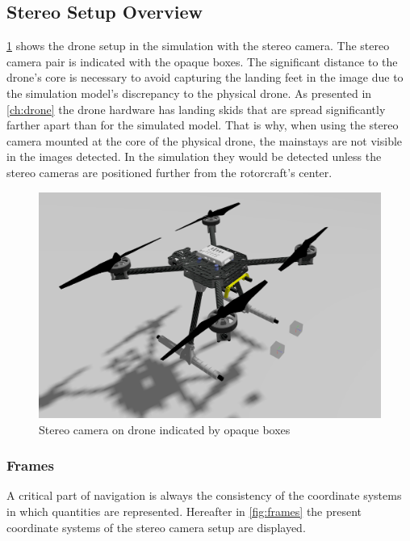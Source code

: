 \subsection{Stereo Setup Overview}

\cref{fig:drone_sim_setup} shows the drone setup in the simulation with the stereo camera. The stereo camera pair is indicated with the opaque boxes. The significant distance to the drone's core is necessary to avoid capturing the landing feet in the image due to the simulation model's discrepancy to the physical drone. As presented in \cref{ch:drone} the drone hardware has landing skids that are spread significantly farther apart than for the simulated model. That is why, when using the stereo camera mounted at the core of the physical drone, the mainstays are not visible in the images detected. In the simulation they would be detected unless the stereo cameras are positioned further from the rotorcraft's center. 

\begin{figure}
    \centering
    \includegraphics[scale=0.32]{images/stereo_camera_depth/drone_with_stereo_cam.png}
    \caption{Stereo camera on drone indicated by opaque boxes}
    \label{fig:drone_sim_setup}
\end{figure}

\subsubsection{Frames}

A critical part of navigation is always the consistency of the coordinate systems in which quantities are represented. Hereafter in \cref{fig:frames} the present coordinate systems of the stereo camera setup are displayed. 

